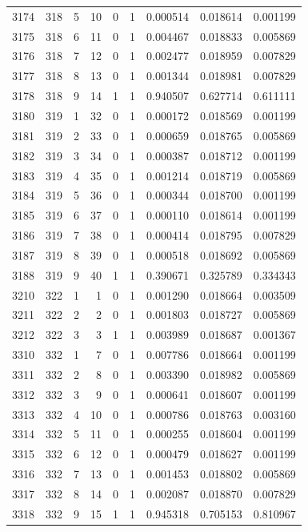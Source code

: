 \begin{longtable}{rrrrrrrrr}
3174 & 318 & 5 & 10 & 0 & 1 & 0.000514 & 0.018614 & 0.001199 \\
3175 & 318 & 6 & 11 & 0 & 1 & 0.004467 & 0.018833 & 0.005869 \\
3176 & 318 & 7 & 12 & 0 & 1 & 0.002477 & 0.018959 & 0.007829 \\
3177 & 318 & 8 & 13 & 0 & 1 & 0.001344 & 0.018981 & 0.007829 \\
3178 & 318 & 9 & 14 & 1 & 1 & 0.940507 & 0.627714 & 0.611111 \\
3180 & 319 & 1 & 32 & 0 & 1 & 0.000172 & 0.018569 & 0.001199 \\
3181 & 319 & 2 & 33 & 0 & 1 & 0.000659 & 0.018765 & 0.005869 \\
3182 & 319 & 3 & 34 & 0 & 1 & 0.000387 & 0.018712 & 0.001199 \\
3183 & 319 & 4 & 35 & 0 & 1 & 0.001214 & 0.018719 & 0.005869 \\
3184 & 319 & 5 & 36 & 0 & 1 & 0.000344 & 0.018700 & 0.001199 \\
3185 & 319 & 6 & 37 & 0 & 1 & 0.000110 & 0.018614 & 0.001199 \\
3186 & 319 & 7 & 38 & 0 & 1 & 0.000414 & 0.018795 & 0.007829 \\
3187 & 319 & 8 & 39 & 0 & 1 & 0.000518 & 0.018692 & 0.005869 \\
3188 & 319 & 9 & 40 & 1 & 1 & 0.390671 & 0.325789 & 0.334343 \\
3210 & 322 & 1 & 1 & 0 & 1 & 0.001290 & 0.018664 & 0.003509 \\
3211 & 322 & 2 & 2 & 0 & 1 & 0.001803 & 0.018727 & 0.005869 \\
3212 & 322 & 3 & 3 & 1 & 1 & 0.003989 & 0.018687 & 0.001367 \\
3310 & 332 & 1 & 7 & 0 & 1 & 0.007786 & 0.018664 & 0.001199 \\
3311 & 332 & 2 & 8 & 0 & 1 & 0.003390 & 0.018982 & 0.005869 \\
3312 & 332 & 3 & 9 & 0 & 1 & 0.000641 & 0.018607 & 0.001199 \\
3313 & 332 & 4 & 10 & 0 & 1 & 0.000786 & 0.018763 & 0.003160 \\
3314 & 332 & 5 & 11 & 0 & 1 & 0.000255 & 0.018604 & 0.001199 \\
3315 & 332 & 6 & 12 & 0 & 1 & 0.000479 & 0.018627 & 0.001199 \\
3316 & 332 & 7 & 13 & 0 & 1 & 0.001453 & 0.018802 & 0.005869 \\
3317 & 332 & 8 & 14 & 0 & 1 & 0.002087 & 0.018870 & 0.007829 \\
3318 & 332 & 9 & 15 & 1 & 1 & 0.945318 & 0.705153 & 0.810967 \\

\end{longtable}
